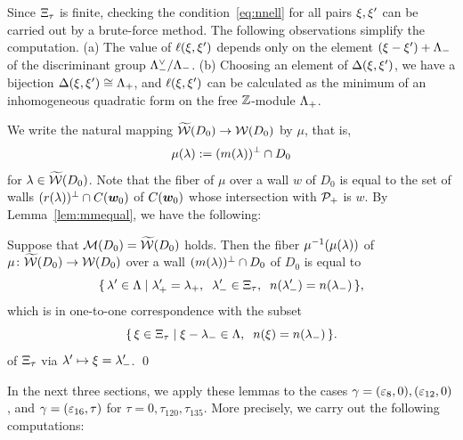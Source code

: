 \documentclass{amsart} %
\begin{document}
%
\begin{remark}\label{rem:MMMtilwalls}
Since $\Xi_{\tau}$ is finite,
checking the condition~\eqref{eq:nnell} for all pairs $\xi, \xi^{\prime}$
 can be carried out by a brute-force method.
The following observations simplify the computation.
(a) 
The value of $\ell(\xi, \xi^{\prime})$ depends only on the element  $(\xi-\xi^{\prime})+\Lambda_{-}$
of the discriminant group $\Lambda_{-}^{\vee}/\Lambda_{-}$.
(b) 
Choosing  an element of $\Delta(\xi, \xi^{\prime})$, 
we have a bijection $\Delta(\xi, \xi^{\prime})\cong \Lambda_{+}$,
and $\ell(\xi, \xi^{\prime})$ can be calculated as  the  minimum of
an inhomogeneous quadratic form on the free $\mathord{\mathbb{Z}}$-module $\Lambda_{+}$.
\end{remark}
%
We write the natural mapping
$\widetilde{\mathord{\mathcal{W}}}(D_0)\to \mathord{\mathcal{W}}(D_0)$
by $\mu$, that is,  
\[
\mu(\lambda):=(m(\lambda))^{\perp}\cap D_0
\]
for  $\lambda\in \widetilde{\mathord{\mathcal{W}}}(D_0)$.
Note that the fiber of $\mu$ over a wall $w$
of $D_0$ is equal to the set of walls  $(r(\lambda))^{\perp}\cap \mathord{C}(\boldsymbol{w}_0)$
of $\mathord{C}(\boldsymbol{w}_0)$ whose intersection with $\mathord{\mathcal{P}}_{+}$ is $w$.
By Lemma~\ref{lem:mmequal}, we have the following:
%
\begin{lemma}\label{lem:wallfiber}
Suppose that $\mathord{\mathcal{M}}(D_0)=\widetilde{\mathord{\mathcal{W}}} (D_0)$ holds.
Then the fiber $\mu^{-1}(\mu(\lambda))$ of  %
$\mu\colon \widetilde{\mathord{\mathcal{W}}}(D_0)\to \mathord{\mathcal{W}}(D_0)$
over a wall $(m(\lambda))^{\perp}\cap D_0$ of $D_0$
is equal to
\[
\set{\lambda\sprime\in \Leech}%
{\lambdaplus\sprime=\lambdaplus, \;\; \lambdaminus\sprime\in \Xitau,  \;\; n(\lambdaminus\sprime)=n(\lambdaminus)},
\]
which  is in one-to-one correspondence with the subset 
\[
\{\,{\xi\in \Xi_{\tau}}\mid {\xi-{\lambda}_{-}\in \Lambda,  \;\; n(\xi)=n({\lambda}_{-})} \,\}.
\]
of $\Xi_{\tau}$ via $\lambda^{\prime} \mapsto \xi={\lambda}_{-}^{\prime}$.
\qed
\end{lemma}
%
In the next three sections, we apply these lemmas to the cases $\gamma=(\varepsilon_8, 0), (\varepsilon_{12}, 0)$,
and  $\gamma=(\varepsilon_{16}, \tau)$ for $\tau=0, \tau_{120}, \tau_{135}$.
More precisely,
we carry out the following computations:
%
\end{document}
